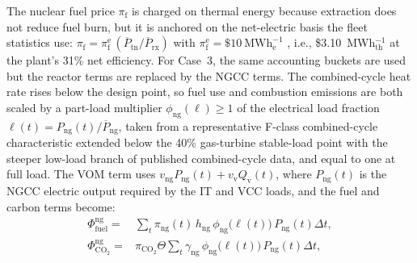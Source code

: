 \documentclass[a4paper,fleqn]{cas-sc}
\begin{document}
The nuclear fuel price $\pi_\mathrm{f}$ is charged on thermal energy because extraction does not reduce fuel burn, but it is anchored on the net-electric basis the fleet statistics use: $\pi_\mathrm{f} = \pi_\mathrm{f}^\mathrm{e}\,(\overline{P}_\mathrm{tn}/\overline{P}_\mathrm{rx})$ with $\pi_\mathrm{f}^\mathrm{e} = \$10~\mathrm{MWh}_\mathrm{e}^{-1}$ \citep{li2026nuclearH2}, i.e., \$3.10~MWh$_\mathrm{th}^{-1}$ at the plant's 31\% net efficiency. For Case~3, the same accounting buckets are used but the reactor terms are replaced by the NGCC terms. The combined-cycle heat rate rises below the design point, so fuel use and combustion emissions are both scaled by a part-load multiplier $\phi_\mathrm{ng}(\ell)\ge 1$ of the electrical load fraction $\ell(t)=P_\mathrm{ng}(t)/\overline{P}_\mathrm{ng}$, taken from a representative F-class combined-cycle characteristic extended below the 40\% gas-turbine stable-load point with the steeper low-load branch of published combined-cycle data, and equal to one at full load. The VOM term uses $v_\mathrm{ng}P_\mathrm{ng}(t)+v_\mathrm{v}Q_\mathrm{v}(t)$, where $P_\mathrm{ng}(t)$ is the NGCC electric output required by the IT and VCC loads, and the fuel and carbon terms become:
\begin{align}
\Phi_\mathrm{fuel}^\mathrm{ng} ={}& \sum_t \pi_\mathrm{ng}(t)\,h_\mathrm{ng}\,\phi_\mathrm{ng}\!\big(\ell(t)\big)\,P_\mathrm{ng}(t)\Delta t, \label{eq:ngcc_fuel_cost}\\
\Phi_\mathrm{CO_2}^\mathrm{ng} ={}&
  \pi_\mathrm{CO_2}\Theta \sum_t
  \gamma_\mathrm{ng}\,\phi_\mathrm{ng}\!\big(\ell(t)\big)\, P_\mathrm{ng}(t)\Delta t, \label{eq:ngcc_carbon_cost}
\end{align}
\end{document}
